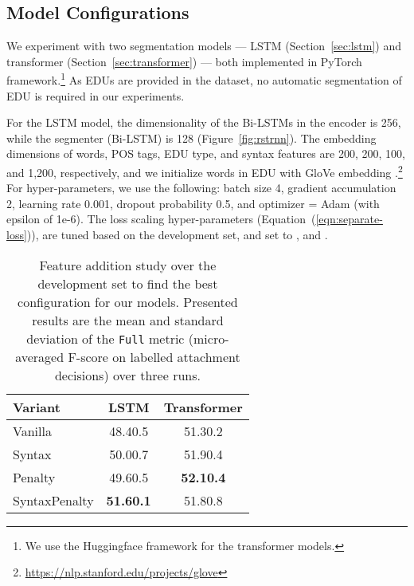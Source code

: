 \documentclass[11pt,a4paper]{article}
\newcommand{\secref}[2][]{Section#1~\ref{sec:#2}}
\newcommand{\figref}[2][]{Figure#1~\ref{fig:#2}}
\newcommand{\eqnref}[2][]{Equation#1~(\ref{eqn:#2})}
\begin{document}
\subsection{Model Configurations}

We experiment with two segmentation models --- LSTM (\secref{lstm}) and
transformer (\secref{transformer}) --- both implemented in PyTorch
framework.\footnote{We use the Huggingface framework for the transformer
  models.} As EDUs are provided in the dataset, no automatic
segmentation of EDU is required in our experiments.

For the LSTM model, the dimensionality of the Bi-LSTMs in the encoder is
256, while the segmenter (Bi-LSTM) is 128
(\figref{rstrnn}).
The embedding dimensions of words,
POS tags, EDU type, and syntax features are 200, 200, 100, and 1,200, respectively, and we initialize words in EDU with GloVe embedding
\cite{pennington-etal-2014-glove}.\footnote{\url{https://nlp.stanford.edu/projects/glove}}   For hyper-parameters, we use the following:
batch size  4, gradient accumulation  2, learning rate  0.001,
dropout probability  0.5, and optimizer = Adam (with epsilon of 1e-6). The loss
scaling hyper-parameters (\eqnref{separate-loss}), are tuned based
on the development set, and set to , and .

\begin{table}[t]
	\begin{center}
		\begin{adjustbox}{max width=0.9\linewidth}
			\begin{tabular}{lcc}
				\toprule
				\textbf{Variant} &  \textbf{LSTM} &
				\textbf{Transformer} \\
				\midrule
				Vanilla &    48.40.5 & 51.30.2 \\
				Syntax &  50.00.7 & 51.90.4  \\
				Penalty & 49.60.5 & \textbf{52.10.4}\\
				SyntaxPenalty &  \textbf{51.60.1} & 51.80.8 \\
				\bottomrule

			\end{tabular}
		\end{adjustbox}
	\end{center}
	\caption{Feature addition study over the development set to find the best configuration for our models. Presented results are the mean and standard deviation of the \texttt{Full} metric (micro-averaged F-score on labelled attachment decisions) over three runs. }
	\label{tab:analysis}
\end{table}
\end{document}
